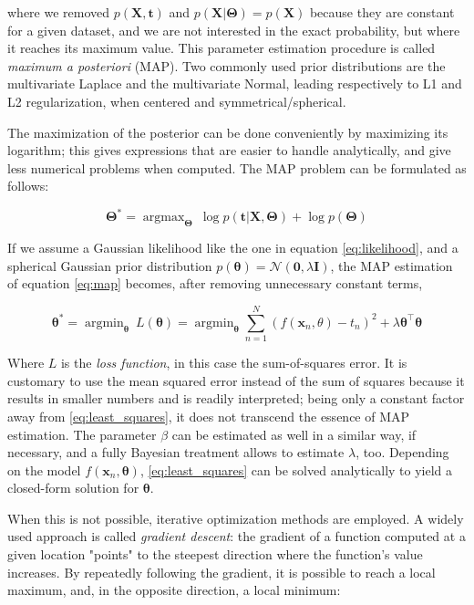 \documentclass[12pt]{book}
\DeclareMathOperator*{\argmin}{argmin}
\DeclareMathOperator*{\argmax}{argmax}
\begin{document}
where we removed $p(\bm X,\bm t)$ and $p(\bm X\vert\bm\Theta)=p(\bm X)$ because they are constant for a given dataset, and we are not interested in the exact probability, but where it reaches its maximum value. This parameter estimation procedure is called \emph{maximum a posteriori} (MAP). Two commonly used prior distributions are the multivariate Laplace and the multivariate Normal, leading respectively to L1 and L2 regularization, when centered and symmetrical/spherical.

The maximization of the posterior can be done conveniently by maximizing its logarithm; this gives expressions that are easier to handle analytically, and give less numerical problems when computed. The MAP problem can be formulated as follows:

\begin{equation}
\bm\Theta^*=\argmax_{\bm\Theta}\ \log p(\bm t\vert\bm X,\bm\Theta)+\log p(\bm\Theta)
\end{equation}


If we assume a Gaussian likelihood like the one in equation \ref{eq:likelihood}, and a spherical Gaussian prior distribution $p(\bm\theta)=\mathcal{N}(\bm 0, \lambda\bm I)$, the MAP estimation of equation \ref{eq:map} becomes, after removing unnecessary constant terms,

\begin{equation}
\label{eq:least_squares}
\bm\theta^*=\argmin_{\bm\theta}\ L(\bm\theta)=\argmin_{\bm\theta}\sum_{n=1}^N\left( f(\bm x_n,\theta)-t_n\right)^2+\lambda\bm\theta^\intercal\bm\theta
\end{equation}

Where $L$ is the \emph{loss function}, in this case the sum-of-squares error. It is customary to use the mean squared error instead of the sum of squares because it results in smaller numbers and is readily interpreted; being only a constant factor away from \ref{eq:least_squares}, it does not transcend the essence of MAP estimation. The parameter $\beta$ can be estimated as well in a similar way, if necessary, and a fully Bayesian treatment allows to estimate $\lambda$, too. Depending on the model $f(\bm x_n,\bm\theta)$, \ref{eq:least_squares} can be solved analytically to yield a closed-form solution for $\bm\theta$.
 
When this is not possible, iterative optimization methods are employed. A widely used approach is called \emph{gradient descent}: the gradient of a function computed at a given location "points" to the steepest direction where the function's value increases. By repeatedly following the gradient, it is possible to reach a local maximum, and, in the opposite direction, a local minimum:
\end{document}
